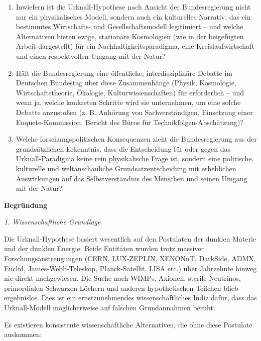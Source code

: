 \documentclass[11pt,a4paper]{letter}
\begin{document}
\begin{letter}
\begin{enumerate}
    \item Inwiefern ist die Urknall-Hypothese nach Ansicht der Bundesregierung nicht nur ein physikalisches Modell, sondern auch ein kulturelles Narrativ, das ein bestimmtes Wirtschafts- und Gesellschaftsmodell legitimiert – und welche Alternativen bieten ewige, stationäre Kosmologien (wie in der beigefügten Arbeit dargestellt) für ein Nachhaltigkeitsparadigma, eine Kreislaufwirtschaft und einen respektvollen Umgang mit der Natur?
    
    \item Hält die Bundesregierung eine öffentliche, interdisziplinäre Debatte im Deutschen Bundestag über diese Zusammenhänge (Physik, Kosmologie, Wirtschaftstheorie, Ökologie, Kulturwissenschaften) für erforderlich – und wenn ja, welche konkreten Schritte wird sie unternehmen, um eine solche Debatte anzustoßen (z. B. Anhörung von Sachverständigen, Einsetzung einer Enquete-Kommission, Bericht des Büros für Technikfolgen-Abschätzung)?
    
    \item Welche forschungspolitischen Konsequenzen zieht die Bundesregierung aus der grundsätzlichen Erkenntnis, dass die Entscheidung für oder gegen das Urknall-Paradigma keine rein physikalische Frage ist, sondern eine politische, kulturelle und weltanschauliche Grundsatzentscheidung mit erheblichen Auswirkungen auf das Selbstverständnis des Menschen und seinen Umgang mit der Natur?
\end{enumerate}

\vspace{0.3cm}

\noindent
\textbf{Begründung}

\vspace{0.2cm}

\noindent
\textit{1. Wissenschaftliche Grundlage}

Die Urknall-Hypothese basiert wesentlich auf den Postulaten der dunklen Materie und der dunklen Energie. Beide Entitäten wurden trotz massiver Forschungsanstrengungen (CERN, LUX-ZEPLIN, XENONnT, DarkSide, ADMX, Euclid, James-Webb-Teleskop, Planck-Satellit, LISA etc.) über Jahrzehnte hinweg nie direkt nachgewiesen. Die Suche nach WIMPs, Axionen, sterile Neutrinos, primordialen Schwarzen Löchern und anderen hypothetischen Teilchen blieb ergebnislos. Dies ist ein ernstzunehmendes wissenschaftliches Indiz dafür, dass das Urknall-Modell möglicherweise auf falschen Grundannahmen beruht.

Es existieren konsistente wissenschaftliche Alternativen, die ohne diese Postulate auskommen:


\end{letter}
\end{document}
